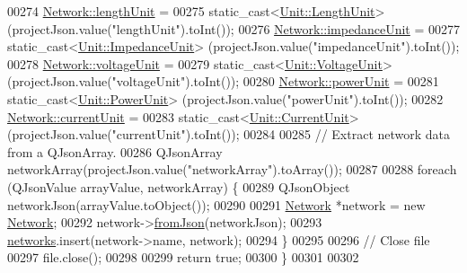 \begin{DoxyCode}
00274   \hyperlink{group___graphics_gae46c0e2bf39b343875e3c69066fe2652}{Network::lengthUnit} =
00275     \textcolor{keyword}{static\_cast<}\hyperlink{class_unit_a8c8921f7b225ad6063b1cb573425b9a0}{Unit::LengthUnit}\textcolor{keyword}{>} (projectJson.value(\textcolor{stringliteral}{"lengthUnit"}).toInt());
00276   \hyperlink{group___graphics_ga5f3d72699a723c64a89d22e34df708ff}{Network::impedanceUnit} =
00277     \textcolor{keyword}{static\_cast<}\hyperlink{class_unit_a3747e779c805df24a71961290be3fbdf}{Unit::ImpedanceUnit}\textcolor{keyword}{>} (projectJson.value(\textcolor{stringliteral}{"impedanceUnit"}).toInt());
00278   \hyperlink{group___graphics_gacde031ef95f5c05565ee35769f2ed89e}{Network::voltageUnit} =
00279     \textcolor{keyword}{static\_cast<}\hyperlink{class_unit_a55b07dfa9457e1eca2c7194fe0cfc3c1}{Unit::VoltageUnit}\textcolor{keyword}{>} (projectJson.value(\textcolor{stringliteral}{"voltageUnit"}).toInt());
00280   \hyperlink{group___graphics_ga9504015bc566f4a3d3b4d4a86000293b}{Network::powerUnit} =
00281     \textcolor{keyword}{static\_cast<}\hyperlink{class_unit_ace265ae255370ccacfd5370337572c3b}{Unit::PowerUnit}\textcolor{keyword}{>} (projectJson.value(\textcolor{stringliteral}{"powerUnit"}).toInt());
00282   \hyperlink{group___graphics_gac6a26db5fef2b1dd2a00faf6340d1702}{Network::currentUnit} =
00283     \textcolor{keyword}{static\_cast<}\hyperlink{class_unit_a0794cf6c9682f48296dd4a5315389787}{Unit::CurrentUnit}\textcolor{keyword}{>} (projectJson.value(\textcolor{stringliteral}{"currentUnit"}).toInt());
00284 
00285   \textcolor{comment}{// Extract network data from a QJsonArray.}
00286   QJsonArray networkArray(projectJson.value(\textcolor{stringliteral}{"networkArray"}).toArray());
00287 
00288   \textcolor{keywordflow}{foreach} (QJsonValue arrayValue, networkArray) \{
00289     QJsonObject networkJson(arrayValue.toObject());
00290 
00291     \hyperlink{class_network}{Network} *network = \textcolor{keyword}{new} \hyperlink{class_network}{Network};
00292     network->\hyperlink{group___graphics_ga2aef0f6c0d9569ec4d6b948d1ef0d5f1}{fromJson}(networkJson);
00293     \hyperlink{class_project_aa98126154cab59769a431668e6f17daf}{networks}.insert(network->name, network);
00294   \}
00295 
00296 \textcolor{comment}{// Close file}
00297   file.close();
00298 
00299   \textcolor{keywordflow}{return} \textcolor{keyword}{true};
00300 \}
00301 
00302 
\end{DoxyCode}
